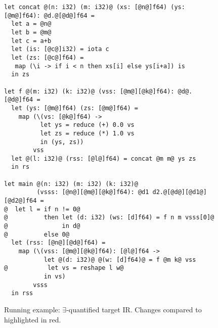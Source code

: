 \begin{figure}
\begin{lstlisting}
let concat @(n: i32) (m: i32)@ (xs: [@n@]f64) (ys: [@m@]f64): @d.@[@d@]f64 =
  let a = @n@
  let b = @m@
  let c = a+b
  let (is: [@c@]i32) = iota c
  let (zs: [@c@]f64) =
   map (\i -> if i < n then xs[i] else ys[i+a]) is
  in zs

let f @(m: i32) (k: i32)@ (vss: [@m@][@k@]f64): @d@.[@d@]f64 =
  let (ys: [@m@]f64) (zs: [@m@]f64) =
    map (\(vs: [@k@]f64) ->
          let ys = reduce (+) 0.0 vs
          let zs = reduce (*) 1.0 vs
          in (ys, zs))
        vss
  let @(l: i32)@ (rss: [@l@]f64) = concat @m m@ ys zs
  in rs

let main @(n: i32) (m: i32) (k: i32)@
         (vsss: [@n@][@m@][@k@]f64): @d1 d2.@[@d@][@d1@][@d2@]f64 =
@  let l = if n != 0@
@          then let (d: i32) (ws: [d]f64) = f n m vsss[0]@
@               in d@
@          else 0@
  let (rss: [@n@][@d@]f64) =
    map (\(vss: [@m@][@k@]f64): [@l@]f64 ->
           let @(d: i32)@ @(w: [d]f64)@ = f @m k@ vss
@           let vs = reshape l w@
           in vs)
        vsss
  in rss
\end{lstlisting}

  \caption{Running example:
    $\exists$-quantified target IR.  Changes compared to
     highlighted in red.}
\label{fig:RunEgTgt}
\end{figure}


